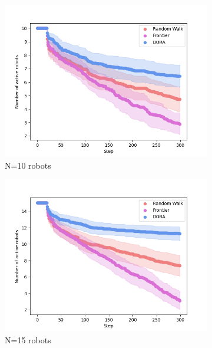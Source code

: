 \documentclass[letterpaper, 10 pt, conference]{ieeeconf}
\begin{document}
\begin{figure}
    \centering
    \begin{subfigure}{0.32\textwidth}
        \includegraphics[width=\textwidth]{images/activerobots_10.png}
        \caption{N=10 robots}
        \label{results:failures10}
    \end{subfigure}
    \begin{subfigure}{0.32\textwidth}
        \includegraphics[width=\textwidth]{images/activerobots_15.png}
        \caption{N=15 robots}
        \label{results:failures15}
    \end{subfigure}
    \begin{subfigure}{0.32\textwidth}

\end{subfigure}
\end{figure}
\end{document}
